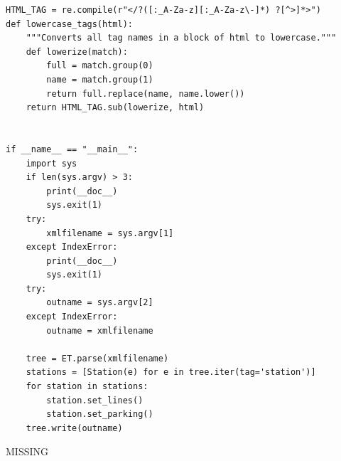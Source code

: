 \documentclass[draft,12pt,titlepage]{article}
\begin{document}
\begin{verbatim}
HTML_TAG = re.compile(r"</?([:_A-Za-z][:_A-Za-z\-]*) ?[^>]*>")
def lowercase_tags(html):
    """Converts all tag names in a block of html to lowercase."""
    def lowerize(match):
        full = match.group(0)
        name = match.group(1)
        return full.replace(name, name.lower())
    return HTML_TAG.sub(lowerize, html)


if __name__ == "__main__":
    import sys
    if len(sys.argv) > 3:
        print(__doc__)
        sys.exit(1)
    try:
        xmlfilename = sys.argv[1]
    except IndexError:
        print(__doc__)
        sys.exit(1)
    try:
        outname = sys.argv[2]
    except IndexError:
        outname = xmlfilename

    tree = ET.parse(xmlfilename)
    stations = [Station(e) for e in tree.iter(tag='station')]
    for station in stations:
        station.set_lines()
        station.set_parking()
    tree.write(outname)

\end{verbatim}

{\huge MISSING}
\end{document}
